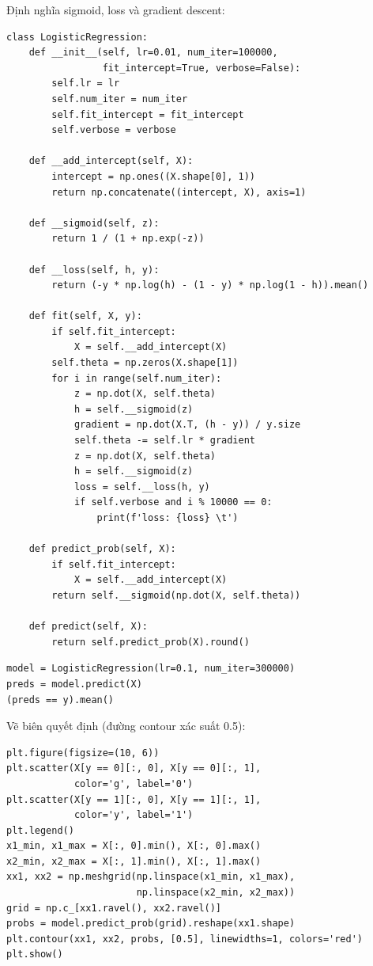 \begin{vidu}[title={Lớp LogisticRegression thủ công}]
Định nghĩa sigmoid, loss và gradient descent:

\begin{lstlisting}
class LogisticRegression:
    def __init__(self, lr=0.01, num_iter=100000,
                 fit_intercept=True, verbose=False):
        self.lr = lr
        self.num_iter = num_iter
        self.fit_intercept = fit_intercept
        self.verbose = verbose

    def __add_intercept(self, X):
        intercept = np.ones((X.shape[0], 1))
        return np.concatenate((intercept, X), axis=1)

    def __sigmoid(self, z):
        return 1 / (1 + np.exp(-z))

    def __loss(self, h, y):
        return (-y * np.log(h) - (1 - y) * np.log(1 - h)).mean()

    def fit(self, X, y):
        if self.fit_intercept:
            X = self.__add_intercept(X)
        self.theta = np.zeros(X.shape[1])
        for i in range(self.num_iter):
            z = np.dot(X, self.theta)
            h = self.__sigmoid(z)
            gradient = np.dot(X.T, (h - y)) / y.size
            self.theta -= self.lr * gradient
            z = np.dot(X, self.theta)
            h = self.__sigmoid(z)
            loss = self.__loss(h, y)
            if self.verbose and i % 10000 == 0:
                print(f'loss: {loss} \t')

    def predict_prob(self, X):
        if self.fit_intercept:
            X = self.__add_intercept(X)
        return self.__sigmoid(np.dot(X, self.theta))

    def predict(self, X):
        return self.predict_prob(X).round()
\end{lstlisting}
\end{vidu}

\begin{vidu}[title={Huấn luyện, dự đoán và đánh giá}]
\begin{lstlisting}
model = LogisticRegression(lr=0.1, num_iter=300000)
preds = model.predict(X)
(preds == y).mean()
\end{lstlisting}

Vẽ biên quyết định (đường contour xác suất 0.5):

\begin{lstlisting}
plt.figure(figsize=(10, 6))
plt.scatter(X[y == 0][:, 0], X[y == 0][:, 1],
            color='g', label='0')
plt.scatter(X[y == 1][:, 0], X[y == 1][:, 1],
            color='y', label='1')
plt.legend()
x1_min, x1_max = X[:, 0].min(), X[:, 0].max()
x2_min, x2_max = X[:, 1].min(), X[:, 1].max()
xx1, xx2 = np.meshgrid(np.linspace(x1_min, x1_max),
                       np.linspace(x2_min, x2_max))
grid = np.c_[xx1.ravel(), xx2.ravel()]
probs = model.predict_prob(grid).reshape(xx1.shape)
plt.contour(xx1, xx2, probs, [0.5], linewidths=1, colors='red')
plt.show()
\end{lstlisting}
\end{vidu}

